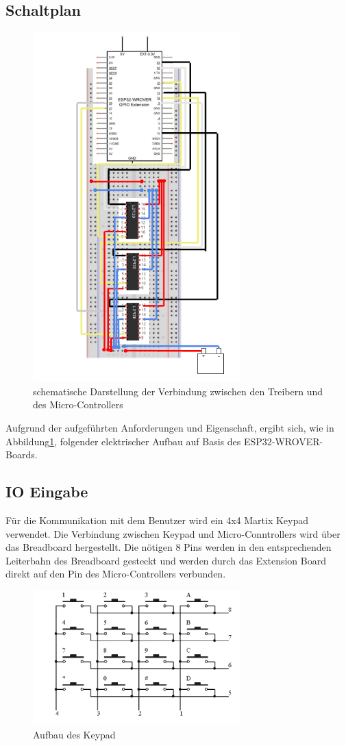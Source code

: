 \documentclass[conference,compsoc,final,a4paper]{IEEEtran}
\begin{document}
\subsection{Schaltplan}
\begin{figure}[h]
\includegraphics[width=8cm]{../images/schaltplan.png}
\caption{schematische Darstellung der Verbindung zwischen den Treibern und des Micro-Controllers}\label{Elektrik:Schaltplan}
\end{figure}

Aufgrund der aufgeführten Anforderungen und Eigenschaft, ergibt sich, wie in Abbildung\ref{Elektrik:Schaltplan}, folgender elektrischer Aufbau auf Basis des ESP32-WROVER-Boards.
\subsection{IO Eingabe}

Für die Kommunikation mit dem Benutzer wird ein 4x4 Martix Keypad verwendet. Die Verbindung zwischen Keypad und Micro-Conntrollers wird über das Breadboard hergestellt. 
Die nötigen 8 Pins werden in den entsprechenden Leiterbahn des Breadboard gesteckt und werden durch das Extension Board  direkt auf den Pin des Micro-Controllers verbunden.

\begin{figure}[h]
\includegraphics[width=8cm]{../images/keypad.png}
\caption{Aufbau des Keypad \autocite{freenoveTutorial}}\label{Elektrik:Keypad}
\end{figure}
\end{document}
